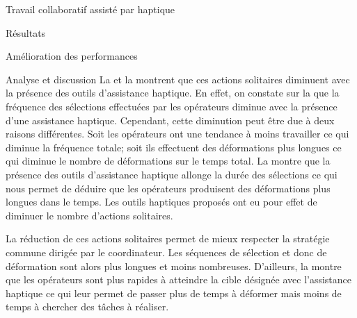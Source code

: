 \documentclass[myfrancais,ngerman,english,frenchb]{mythesis}
\begin{document}
\begin{mychapter}{Travail collaboratif assisté par haptique}
\begin{mysection}{Résultats}
\begin{mysubsection}{Amélioration des performances}
\begin{mysubsubsection}{Analyse et discussion}
					La  et la  montrent que ces actions solitaires diminuent avec la présence des outils d'assistance haptique.
					En effet, on constate sur la  que la fréquence des sélections effectuées par les opérateurs diminue avec la présence d'une assistance haptique.
					Cependant, cette diminution peut être due à deux raisons différentes.
					Soit les opérateurs ont une tendance à moins travailler ce qui diminue la fréquence totale; soit ils effectuent des déformations plus longues ce qui diminue le nombre de déformations sur le temps total.
					La  montre que la présence des outils d'assistance haptique allonge la durée des sélections ce qui nous permet de déduire que les opérateurs produisent des déformations plus longues dans le temps.
					Les outils haptiques proposés ont eu pour effet de diminuer le nombre d'actions solitaires.

					La réduction de ces actions solitaires permet de mieux respecter la stratégie commune dirigée par le coordinateur.
					Les séquences de sélection et donc de déformation sont alors plus longues et moins nombreuses.
					D'ailleurs, la  montre que les opérateurs sont plus rapides à atteindre la cible désignée avec l'assistance haptique ce qui leur permet de passer plus de temps à déformer mais moins de temps à chercher des tâches à réaliser.


\end{mysubsubsection}
\end{mysubsection}
\end{mysection}
\end{mychapter}
\end{document}
